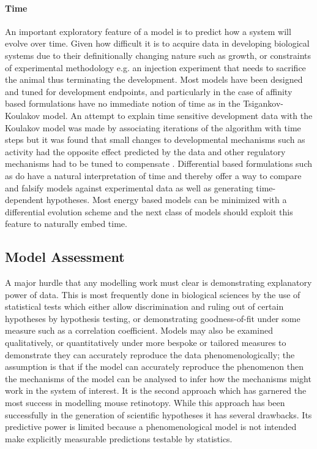 \paragraph{Time \label{model:time}}
An important exploratory feature of a model is to predict how a system will evolve over time. Given how difficult it is to acquire data in developing biological systems due to their definitionally changing nature such as growth, or constraints of experimental methodology e.g. an injection experiment that needs to sacrifice the animal thus terminating the development. Most models have been designed and tuned for development endpoints, and particularly in the case of affinity based formulations have no immediate notion of time as in the Tsigankov-Koulakov model. An attempt to explain time sensitive development data with the Koulakov model was made by associating iterations of the algorithm with time steps but it was found that small changes to developmental mechanisms such as activity had the opposite effect predicted by the data and other regulatory mechanisms had to be tuned to compensate \cite{Lyngholm2019-fs}. Differential based formulations such as do have a natural interpretation of time and thereby offer a way to compare and falsify models against experimental data as well as generating time-dependent hypotheses. Most energy based models can be minimized with a differential evolution scheme and the next class of models should exploit this feature to naturally embed time.
\subsection{Model Assessment \label{model:assessment}}
A major hurdle that any modelling work must clear is demonstrating explanatory power of data. This is most frequently done in biological sciences by the use of statistical tests which either allow discrimination and ruling out of certain hypotheses by hypothesis testing, or demonstrating goodness-of-fit under some measure such as a correlation coefficient. Models may also be examined qualitatively, or quantitatively under more bespoke or tailored measures to demonstrate they can accurately reproduce the data phenomenologically; the assumption is that if the model can accurately reproduce the phenomenon then the mechanisms of the model can be analysed to infer how the mechanisms might work in the system of interest. It is the second approach which has garnered the most success in modelling mouse retinotopy. While this approach has been successfully in the generation of scientific hypotheses it has several drawbacks. Its predictive power is limited because a phenomenological model is not intended make explicitly measurable predictions testable by statistics.


